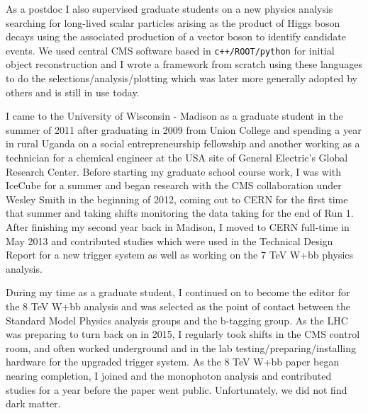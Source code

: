\documentclass[10pt]{article} %
\begin{document}
As a postdoc I also supervised graduate students on a new physics analysis searching for long-lived scalar particles arising as the product of Higgs boson decays using the associated production of a vector boson to identify candidate events. We used central CMS software based in \texttt{c++/ROOT/python} for initial object reconstruction and I wrote a framework from scratch using these languages to do the selections/analysis/plotting which was later more generally adopted by others and is still in use today.

\vspace{5pt}

I came to the University of Wisconsin - Madison as a graduate student in the summer of 2011 after graduating in 2009 from Union College and spending a year in rural Uganda on a social entrepreneurship fellowship and another working as a technician for a chemical engineer at the USA site of General Electric's Global Research Center. Before starting my graduate school course work, I was with IceCube for a summer and began research with the CMS collaboration under Wesley Smith in the beginning of 2012, coming out to CERN for the first time that summer and taking shifts monitoring the data taking for the end of Run 1. After finishing my second year back in Madison, I moved to CERN full-time in May 2013 and contributed studies which were used in the Technical Design Report for a new trigger system as well as working on the 7 TeV W+bb physics analysis.

During my time as a graduate student, I continued on to become the editor for the 8 TeV W+bb analysis and was selected as the point of contact between the Standard Model Physics analysis groups and the b-tagging group. As the LHC was preparing to turn back on in 2015, I regularly took shifts in the CMS control room, and often worked underground and in the lab testing/preparing/installing hardware for the upgraded trigger system. As the 8 TeV W+bb paper began nearing completion, I joined and the monophoton analysis and contributed studies for a year before the paper went public. Unfortunately, we did not find dark matter. 
\end{document}
